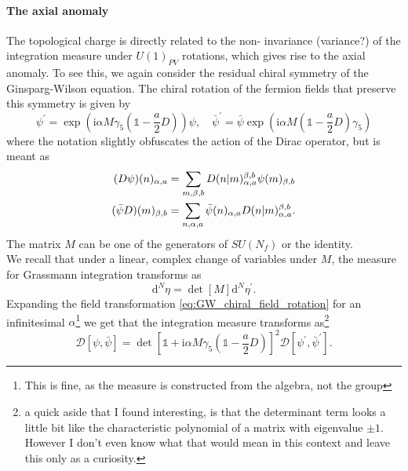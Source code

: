 \documentclass[a4paper,10pt]{book}
\begin{document}
\paragraph{The axial anomaly}
The topological charge is directly related to the  non- invariance (variance?) of the integration measure under $U(1)_{PV}$ rotations, which gives rise to the axial anomaly. To see this, we again consider the residual chiral symmetry of the Ginsparg-Wilson equation. The chiral rotation of the fermion fields that preserve this symmetry is given by
\begin{equation}
\psi^{\prime}=\exp \left(\mathrm{i} \alpha M \gamma_{5}\left(\mathbb{1}-\frac{a}{2} D\right)\right) \psi, \quad \bar{\psi}^{\prime}=\bar{\psi} \exp \left(\mathrm{i} \alpha M\left(\mathbb{1}-\frac{a}{2} D\right) \gamma_{5}\right)
\end{equation}
where the notation slightly obfuscates the action of the Dirac operator, but is meant as 
\begin{equation}\label{eq:GW_chiral_field_rotation}
\begin{aligned} 
(D \psi)(n)_{\alpha,a}&=\sum_{m, \beta, b} D(n \mkern-5mu\mid \mkern-5mu m)_{\alpha ,a}^{\beta,b} \psi(m)_{\beta,b}\\(\bar{\psi} D)(m)_{\beta,b}&=\sum_{n, \alpha, a} \bar{\psi}(n)_{\alpha,a} D(n\mkern-5mu \mid\mkern-5mu m)_{\alpha,a}^{ \beta,b}.
\end{aligned}
\end{equation}
The matrix $M$ can be one of the generators of $SU(N_f)$ or the identity.\\We recall that under a linear, complex change of variables under $M$, the measure for Grassmann integration transforms as
\begin{equation}
\mathrm{d}^{N} \eta=\operatorname{det}[M] \mathrm{d}^{N} \eta^{\prime}.
\end{equation}
Expanding the field transformation \eqref{eq:GW_chiral_field_rotation} for an infinitesimal $\alpha$\footnote{This is fine, as the measure is constructed from the algebra, not the group} we get that the integration measure transforms as\footnote{a quick aside that I found interesting, is that the determinant term looks a little bit like the characteristic polynomial of a matrix with eigenvalue $\pm 1$. However I don't even know what that would mean in this context and leave this only as a curiosity.}
\begin{equation}
\mathcal{D}[\psi, \bar{\psi}]= \operatorname{det}\left[\mathbb{1}+\mathrm{i} \alpha M \gamma_{5}\left(\mathbb{1}-\frac{a}{2} D\right)\right]^{2}\mathcal{D}\left[\psi^{\prime}, \bar{\psi}^{\prime}\right].
\end{equation}
\end{document}
